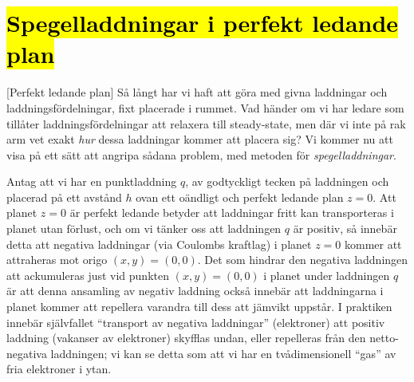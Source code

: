 {\section{{\hl{Spegelladdningar i perfekt ledande plan}}}
[Perfekt ledande plan]
S{\aa} l{\aa}ngt har vi haft att g{\"o}ra med givna laddningar och
laddningsf{\"o}rdelningar, fixt placerade i rummet. Vad h{\"a}nder om
vi har ledare som till{\aa}ter laddningsf{\"o}rdelningar att relaxera till
steady-state, men d{\"a}r vi inte p{\aa} rak arm vet exakt {\it hur} dessa
laddningar kommer att placera sig? Vi kommer nu att visa p{\aa} ett s{\"a}tt
att angripa s{\aa}dana problem, med metoden f{\"o}r {\it spegelladdningar}.

Antag att vi har en punktladdning $q$, av godtyckligt tecken p{\aa} laddningen
och placerad p{\aa} ett avst{\aa}nd $h$ ovan ett o{\"a}ndligt och perfekt
ledande plan $z=0$.
\noindent
Att planet $z=0$ {\"a}r perfekt ledande betyder att laddningar fritt kan
transporteras i planet utan f{\"o}rlust, och om vi t{\"a}nker oss att laddningen
$q$ {\"a}r positiv, s{\aa} inneb{\"a}r detta att negativa laddningar (via
Coulombs kraftlag) i planet $z=0$ kommer att attraheras mot origo $(x,y)=(0,0)$.
Det som hindrar den negativa laddningen att ackumuleras just vid punkten
$(x,y)=(0,0)$ i planet under laddningen $q$ {\"a}r att denna ansamling av
negativ laddning ocks{\aa} inneb{\"a}r att laddningarna i planet kommer att
repellera varandra till dess att j{\"a}mvikt uppst{\aa}r.
I praktiken inneb{\"a}r sj{\"a}lvfallet ``transport av negativa laddningar''
(elektroner) att positiv laddning (vakanser av elektroner) skyfflas undan,
eller repelleras fr{\aa}n den netto-negativa laddningen; vi kan se detta som
att vi har en tv{\aa}dimensionell ``gas'' av fria elektroner i ytan.
\vfill\eject

}
